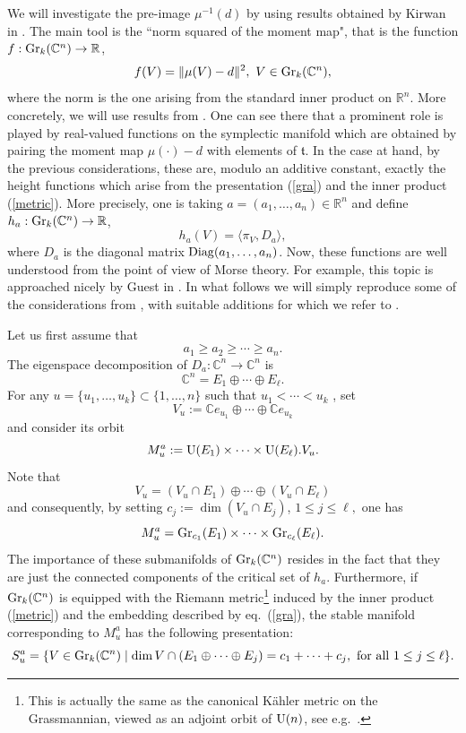 \documentclass[12pt]{amsart}
\theoremstyle{definition}
\theoremstyle{remark}
\newcommand{\RR}{\mathbb R}
\newcommand{\CC}{\mathbb C}
\begin{document}
We will investigate the pre-image $\mu^{-1}(d)$ by using results obtained  by Kirwan  in \cite{Ki}. 
The main tool is the ``norm squared of the moment map", that is the function  
 $f:{\rm Gr}_k(\CC^n) \to \RR$, $$f(V) = \|\mu(V)-d \|^2, \ V\in {\rm Gr}_k(\CC^n),$$
 where the norm is the one arising from the standard inner product on $\RR^n$. 
 More concretely, we will use  results from \cite[Sect.~4]{Ki}.
 One can see there that a prominent role is played by real-valued functions on the symplectic manifold which are obtained by pairing the moment map $\mu(\cdot) - d$ with elements  of ${\mathfrak t}$. In the case at hand, by the previous considerations, these are, modulo an additive constant, exactly the height functions which arise from the presentation (\ref{gra}) and the inner product (\ref{metric}). More precisely,   one is taking 
 $a=(a_1, \ldots, a_n) \in \RR^n$ and define $h_a: {\rm Gr}_k(\CC^n) \to \RR$, \begin{equation}\label{hadef}h_a(V)=\langle \pi_V,D_a\rangle,\end{equation}
where $D_a$ is the diagonal matrix ${\rm Diag} (a_1, \ldots, a_n)$. 
Now, these functions are well understood from the point of view of Morse theory. 
For example, this topic is approached nicely by Guest in \cite[Sect.~3]{Gu}. In what follows we will simply reproduce some of the  considerations from \cite{Gu}, with suitable additions  for which we refer to \cite[Sect.~2]{Mare}. 

 
Let us first assume that 
\begin{equation}\label{ineqa}a_1\ge a_2 \ge \cdots \ge a_n.\end{equation}
The eigenspace decomposition of $D_a: \CC^n \to \CC^n$ is
$$\CC^n=E_1 \oplus \cdots \oplus E_\ell.$$
For any $u=\{u_1, \ldots , u_k\}\subset \{1, \ldots, n\}$  such that $u_1 < \cdots < u_k$ , set 
$$V_u:=\CC e_{u_1} \oplus \cdots \oplus \CC e_{u_k}$$
and consider its orbit 
$$M_{u}^a:={\rm U}(E_1) \times \cdots \times  {\rm U}(E_\ell) .V_u.$$
Note that 
$$V_u = (V_u \cap E_1) \oplus \cdots \oplus (V_u\cap E_\ell)$$
and consequently, by setting  $c_j:=\dim (V_u\cap E_j)$, $1\le j \le \ell,$ one has
\begin{equation}\label{mu}M_{u}^a={\rm Gr}_{c_1}(E_1) \times \cdots \times {\rm Gr}_{c_\ell}(E_\ell).\end{equation}
The importance of these submanifolds of ${\rm Gr}_k(\CC^n)$ resides in the fact that they are just the connected components 
of the critical set of $h_a$. Furthermore, if ${\rm Gr}_k(\CC^n)$ is equipped with the Riemann metric\footnote{This is actually the same as the canonical K\"ahler metric on the Grassmannian, viewed as an adjoint orbit of ${\rm U}(n)$, see e.g.~\cite{EM}.}  induced by the inner product (\ref{metric})
and the embedding described by eq.~(\ref{gra}),   the   stable manifold corresponding   to $M_{u}^a$
has the following presentation:
\begin{equation}\label{stablemnf}S_{u}^a = \{V \in {\rm Gr}_k(\CC^n) \mid \dim V \cap (E_1 \oplus \cdots \oplus E_j)= c_1+ \cdots + c_j, 
\ {\rm for \ all } \ 1\le j \le \ell\}.\end{equation}
\end{document}
